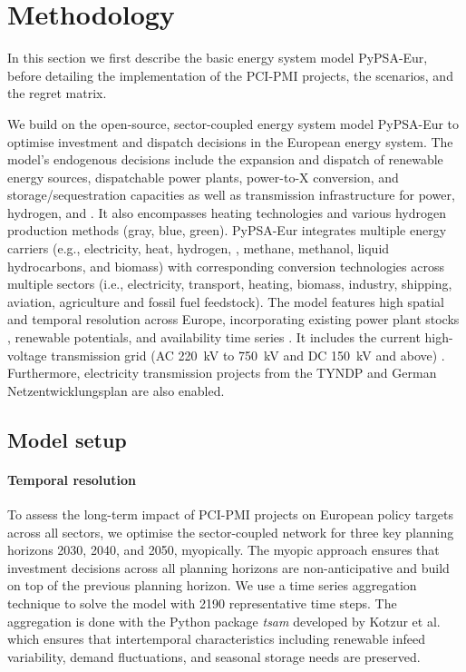 \documentclass[preprint,12pt,sort&compress]{elsarticle}
\begin{document}
\section{Methodology}
\label{sec:methodology}
In this section we first describe the basic energy system model PyPSA-Eur, before detailing the implementation of the PCI-PMI projects, the scenarios, and the regret matrix.

We build on the open-source, sector-coupled energy system model PyPSA-Eur \cite{neumannPotentialRoleHydrogen2023,frysztackiComparisonClusteringMethods2022,glaumOffshorePowerHydrogen2024,horschPyPSAEurOpenOptimisation2018} to optimise investment and dispatch decisions in the European energy system. The model's endogenous decisions include the expansion and dispatch of renewable energy sources, dispatchable power plants, power-to-X conversion, and storage/sequestration capacities as well as transmission infrastructure for power, hydrogen, and . It also encompasses heating technologies and various hydrogen production methods (gray, blue, green).
PyPSA-Eur integrates multiple energy carriers (e.g., electricity, heat, hydrogen, , methane, methanol, liquid hydrocarbons, and biomass) with corresponding conversion technologies across multiple sectors (i.e., electricity, transport, heating, biomass, industry, shipping, aviation, agriculture and fossil fuel feedstock). The model features high spatial and temporal resolution across Europe, incorporating existing power plant stocks \cite{gotzensPerformingEnergyModelling2019}, renewable potentials, and availability time series \cite{hofmannAtliteLightweightPython2021}. It includes the current high-voltage transmission grid (AC \SI{220}{kV} to \SI{750}{kV} and DC \SI{150}{kV} and above) \cite{xiongModellingHighvoltageGrid2025}. Furthermore, electricity transmission projects from the TYNDP \cite{entso-eTenYearNetworkDevelopment2020} and German Netzentwicklungsplan \cite{bnetzaBestaetigungNetzentwicklungsplanStrom2024} are also enabled.

\subsection{Model setup}
\label{sec:model_setup}


\paragraph{Temporal resolution}
\label{sec:temporal_resolution}
To assess the long-term impact of PCI-PMI projects on European policy targets across all sectors, we optimise the sector-coupled network for three key planning horizons 2030, 2040, and 2050, myopically. The myopic approach ensures that investment decisions across all planning horizons are non-anticipative and build on top of the previous planning horizon. We use a time series aggregation technique to solve the model with 2190 representative time steps. The aggregation is done with the Python package \textit{tsam} developed by Kotzur et al. \cite{kotzurImpactDifferentTime2018} which ensures that intertemporal characteristics including renewable infeed variability, demand fluctuations, and seasonal storage needs are preserved.
\end{document}
